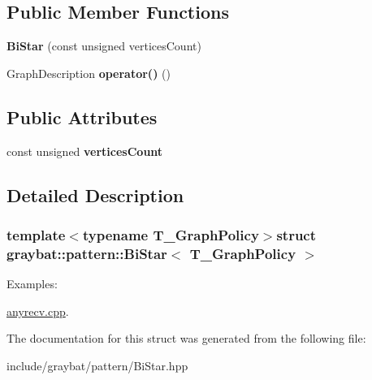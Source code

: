 \subsection*{Public Member Functions}
\begin{DoxyCompactItemize}
\item 
\hypertarget{structgraybat_1_1pattern_1_1BiStar_a1e0102965ea0ac229e95a2cd57db86d5}{}{\bfseries Bi\+Star} (const unsigned vertices\+Count)\label{structgraybat_1_1pattern_1_1BiStar_a1e0102965ea0ac229e95a2cd57db86d5}

\item 
\hypertarget{structgraybat_1_1pattern_1_1BiStar_a881de59bec1ca2640b4aef5eec2d08fe}{}Graph\+Description {\bfseries operator()} ()\label{structgraybat_1_1pattern_1_1BiStar_a881de59bec1ca2640b4aef5eec2d08fe}

\end{DoxyCompactItemize}
\subsection*{Public Attributes}
\begin{DoxyCompactItemize}
\item 
\hypertarget{structgraybat_1_1pattern_1_1BiStar_a92fe074a2b9adcb729435461fb979da2}{}const unsigned {\bfseries vertices\+Count}\label{structgraybat_1_1pattern_1_1BiStar_a92fe074a2b9adcb729435461fb979da2}

\end{DoxyCompactItemize}


\subsection{Detailed Description}
\subsubsection*{template$<$typename T\+\_\+\+Graph\+Policy$>$struct graybat\+::pattern\+::\+Bi\+Star$<$ T\+\_\+\+Graph\+Policy $>$}

\begin{Desc}
\item[Examples\+: ]\par
\hyperlink{anyrecv_8cpp-example}{anyrecv.\+cpp}.\end{Desc}


The documentation for this struct was generated from the following file\+:\begin{DoxyCompactItemize}
\item 
include/graybat/pattern/Bi\+Star.\+hpp\end{DoxyCompactItemize}
